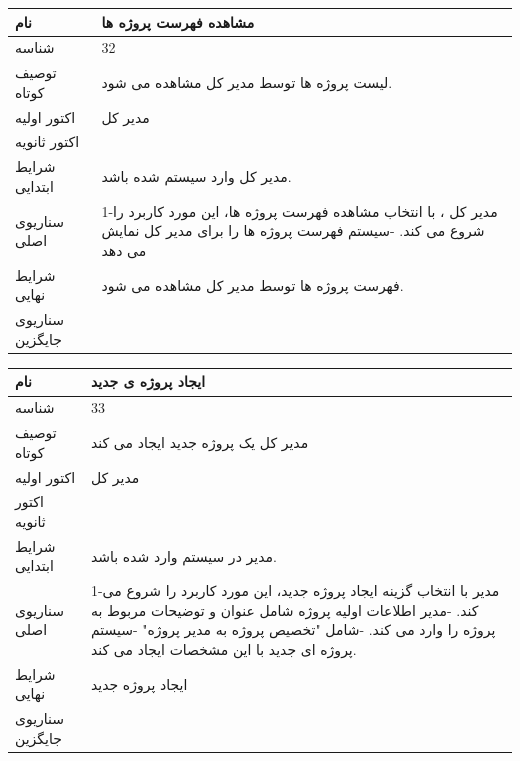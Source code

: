\documentclass{article}
\begin{document}
\vspace{2cm}

\begin{tabular}{|p{2cm}|p{10cm}|}
\hline
نام
&
 مشاهده  فهرست پروژه ها
\\
\hline
شناسه
&
32
\\
\hline
توصیف کوتاه
&
لیست پروژه ها توسط مدیر کل مشاهده می شود.
\\
\hline
اکتور اولیه
&
مدیر کل
\\
\hline
اکتور ثانویه
&

\\
\hline
شرایط ابتدایی
&
مدیر کل وارد سیستم شده باشد. 
\\
\hline
سناریوی اصلی
&
1-مدیر کل ، با انتخاب مشاهده  فهرست پروژه ها، این مورد کاربرد را شروع می کند.
\newline
2-سیستم فهرست پروژه ها را برای مدیر کل نمایش می دهد
\\
\hline
شرایط نهایی
&
 فهرست پروژه ها توسط مدیر کل مشاهده می شود.
\\
\hline
سناریوی جایگزین
&

\\
\hline
\end{tabular}

\vspace{2cm}


\begin{tabular}{|p{2cm}|p{10cm}|}
\hline
نام
&
ایجاد پروژه ی جدید
\\
\hline
شناسه
&
33
\\
\hline
توصیف کوتاه
&
مدیر کل یک پروژه جدید ایجاد می کند
\\
\hline
اکتور اولیه
&
مدیر کل
\\
\hline
اکتور ثانویه
&

\\
\hline
شرایط ابتدایی
&
مدیر در سیستم وارد شده باشد.
\\
\hline
سناریوی اصلی
&
1-مدیر با انتخاب گزینه ایجاد پروژه جدید، این مورد کاربرد را شروع می کند.
\newline
2-مدیر اطلاعات اولیه پروژه شامل عنوان و توضیحات مربوط به پروژه را وارد می کند.
\newline
3-شامل "تخصیص پروژه به مدیر پروژه"
\newline
3-سیستم پروژه ای جدید با این مشخصات ایجاد می کند. 
\\
\hline
شرایط نهایی
&
ایجاد پروژه جدید
\\
\hline
سناریوی جایگزین
&

\\
\hline
\end{tabular}
\end{document}
